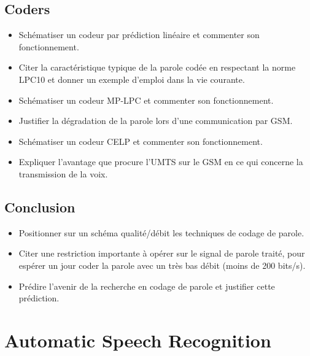 \documentclass[letterpaper, 12pt]{article}
\begin{document}
	\subsection{Coders}
		\begin{itemize}
			\setlength{\itemsep}{0pt}		
			\setlength{\parskip}{0pt}		
			\setlength{\parsep}{0pt}	
			\item Schématiser un codeur par prédiction linéaire et commenter son fonctionnement.
		    \item Citer la caractéristique typique de la parole codée en respectant la norme LPC10 et donner 
		    	un exemple d'emploi dans la vie courante.
		    \item Schématiser un codeur MP-LPC et commenter son fonctionnement.
		    \item Justifier la dégradation de la parole lors d'une communication par GSM.
		    \item Schématiser un codeur CELP et commenter son fonctionnement.
		    \item Expliquer l'avantage que procure l'UMTS sur le GSM en ce qui concerne la transmission de la voix.
		\end{itemize}
	\subsection{Conclusion}
		\begin{itemize}
			\setlength{\itemsep}{0pt}		
			\setlength{\parskip}{0pt}		
			\setlength{\parsep}{0pt}	
			\item Positionner sur un schéma qualité/débit les techniques de codage de parole.
		    \item Citer une restriction importante à opérer sur le signal de parole traité, pour espérer 
		    	un jour coder la parole avec un très bas débit (moins de 200 bits/s).
		    \item Prédire l'avenir de la recherche en codage de parole et justifier cette prédiction.
		\end{itemize}
\section{Automatic Speech Recognition}
\end{document}
